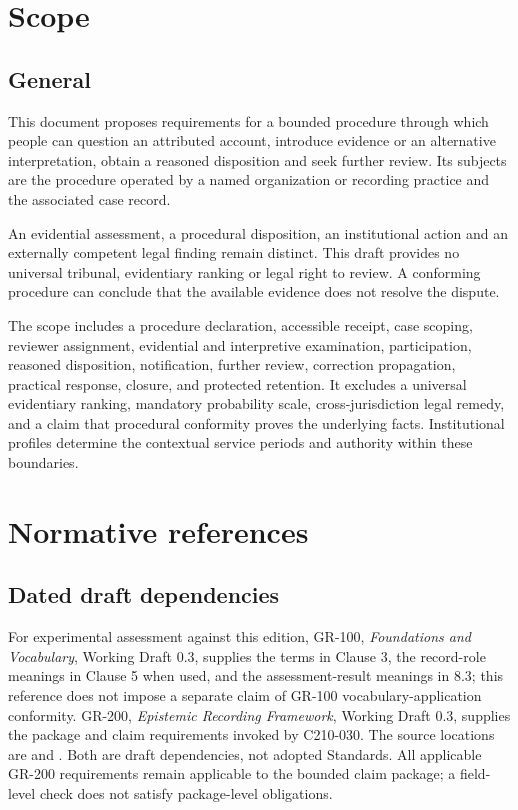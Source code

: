 \documentclass[11pt,a4paper]{article}
\begin{document}
\GSPmainmatter
\section{Scope}
\subsection{General}

This document proposes requirements for a bounded procedure through which people can question an attributed account, introduce evidence or an alternative interpretation, obtain a reasoned disposition and seek further review. Its subjects are the procedure operated by a named organization or recording practice and the associated case record.

An evidential assessment, a procedural disposition, an institutional action and an externally competent legal finding remain distinct. This draft provides no universal tribunal, evidentiary ranking or legal right to review. A conforming procedure can conclude that the available evidence does not resolve the dispute.

The scope includes a procedure declaration, accessible receipt, case scoping, reviewer assignment, evidential and interpretive examination, participation, reasoned disposition, notification, further review, correction propagation, practical response, closure, and protected retention. It excludes a universal evidentiary ranking, mandatory probability scale, cross-jurisdiction legal remedy, and a claim that procedural conformity proves the underlying facts. Institutional profiles determine the contextual service periods and authority within these boundaries.

\section{Normative references}
\subsection{Dated draft dependencies}
For experimental assessment against this edition, GR-100, \emph{Foundations and Vocabulary}, Working Draft 0.3, supplies the terms in Clause 3, the record-role meanings in Clause 5 when used, and the assessment-result meanings in 8.3; this reference does not impose a separate claim of GR-100 vocabulary-application conformity. GR-200, \emph{Epistemic Recording Framework}, Working Draft 0.3, supplies the package and claim requirements invoked by C210-030. The source locations are  and . Both are draft dependencies, not adopted Standards. All applicable GR-200 requirements remain applicable to the bounded claim package; a field-level check does not satisfy package-level obligations.
\end{document}
